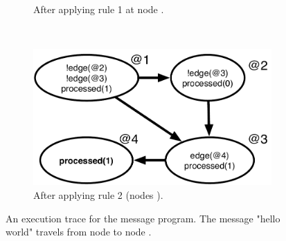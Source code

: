 \begin{figure}[h]
\begin{subfigure}[b]{\visitsize\textwidth}
                \caption{After applying rule 1 at node .}
                \label{fig:message_trace3}
        \end{subfigure}%
        ~
        \begin{subfigure}[b]{\visitsize\textwidth}
                  \includegraphics[width=\textwidth]{figures/message/message_trace4}
                  \caption{After applying rule 2 (nodes ).}
                  \label{fig:message_trace4}
          \end{subfigure}
        \caption{An execution trace for the message program. The message "hello
        world" travels from node  to node .}\label{fig:message_trace}
\end{figure}

